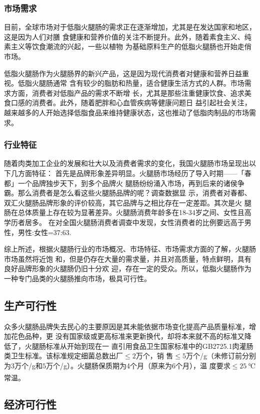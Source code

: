 \documentclass[UTF8]{ctexart}
\begin{document}
	\subsubsection{市场需求}
	目前，全球市场对于低脂火腿肠的需求正在逐渐增加，尤其是在发达国家和地区，这是因为人们对膳
	食健康和营养价值的关注不断提升。此外，随着素食主义、纯素主义等饮食潮流的兴起，一些以植物
	为基础原料生产的低脂火腿肠也开始走俏市场。

	低脂火腿肠作为火腿肠界的新兴产品，这是因为现代消费者对健康和营养日益重视。低脂火腿肠通常
	含有较少的脂肪和热量，适合健康生活方式的人群。市场需求方面，消费者对低脂产品的需求不断增
	长，尤其是那些注重健康饮食、追求美食口感的消费者。此外，随着肥胖和心血管疾病等健康问题日
	益引起社会关注，越来越多的人开始选择低脂食品来维持健康状态，这也推动了低脂肉制品的市场需
	求。

	\subsubsection{行业特征}
	随着肉类加工企业的发展和壮大以及消费者需求的变化，我国火腿肠市场呈现出以下几方面特征：
	首先是品牌形象差异明显。火腿肠市场经历了导入时期——「春都」一个品牌独步天下，到多个品牌火
	腿肠纷纷涌入市场，再到后来的诸侯争霸。那么消费者是怎么看这些火腿肠品牌的呢？调查数据显
	示，消费者对春都、双汇火腿肠品牌形象的评价较高，其它品牌与之相比存在一定差距。其次是火
	腿肠在总体质量上存在较为显著差异。火腿肠消费年龄多在18-34岁之间、女性且高学历者居多。
	在对全国火腿肠消费者调查中发现，女性消费者的比例要远高于男性，男性:女性=37:63.
	
	综上所述，根据火腿肠行业的市场概况、市场特征、市场需求方面的了解，火腿肠市场虽然将近饱
	和，但是仍存在大量的需求量，并且对高质量，特点鲜明，具有良好品牌形象的火腿肠仍旧十分欢
	迎，存在一定的受众。所以，低脂火腿肠作为一种专门品类的火腿肠推向市场，极具可行性。

	\subsection{生产可行性}
	众多火腿肠品牌失去民心的主要原因是其未能依据市场变化提高产品质量标准，增加花色品种，更
	没有国家级或更高标准来更新换代，却将本来就不高的标准又降低了，火腿肠标准从开始到现在一
	直引用食品卫生国家标准中的GB2725.1肉灌肠类卫生标准。该标准规定细菌总数出厂$\le 2$万个，销
	售$\le 5$万个/g（未修订前分别为$3$万个/g和$5$万个/g）。火腿肠保质期为4个月（原来为6个月），温
	度要求$\le 25~℃$常温\textsuperscript{\cite{ref8}}。

	\subsection{经济可行性}
\end{document}
